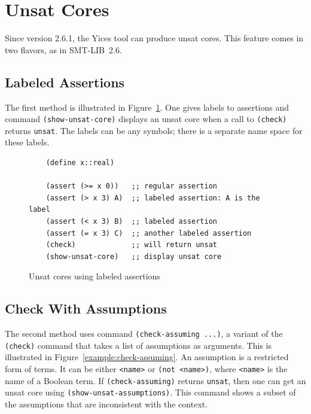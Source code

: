 \documentclass[11pt,twoside,fleqn,openright,titlepage]{cslreport}
\begin{document}
\section{Unsat Cores}

Since version 2.6.1, the Yices tool can produce unsat cores. This
feature comes in two flavors, as in SMT-LIB~2.6.

\subsection{Labeled Assertions}

The first method is illustrated in
Figure~\ref{example:labeled-assertions}. One gives labels to assertions and
command \texttt{(show-unsat-core)} displays an unsat core when a call
to \texttt{(check)} returns \texttt{unsat}.  The labels can be any
symbols; there is a separate name space for these labels.

\begin{figure}[h]
\begin{footnotesize}
\begin{verbatim}
    (define x::real)

    (assert (>= x 0))   ;; regular assertion
    (assert (> x 3) A)  ;; labeled assertion: A is the label
    (assert (< x 3) B)  ;; labeled assertion
    (assert (= x 3) C)  ;; another labeled assertion
    (check)             ;; will return unsat
    (show-unsat-core)   ;; display unsat core
\end{verbatim}
\end{footnotesize}
\caption{Unsat cores using labeled assertions}
\label{example:labeled-assertions}
\end{figure}


\subsection{Check With Assumptions}

The second method uses command \texttt{(check-assuming ...)}, a
variant of the \texttt{(check)} command that takes a list of
assumptions as arguments.  This is illustrated in
Figure~\ref{example:check-assuming}. An assumption is a restricted
form of terms. It can be either \texttt{<name>} or \texttt{(not
  <name>)}, where \texttt{<name>} is the name of a Boolean term.  If
\texttt{(check-assuming)} returns \texttt{unsat}, then one can get an
unsat core using \texttt{(show-unsat-assumptions)}. This command shows
a subset of the assumptions that are inconsistent with the context.
\end{document}

